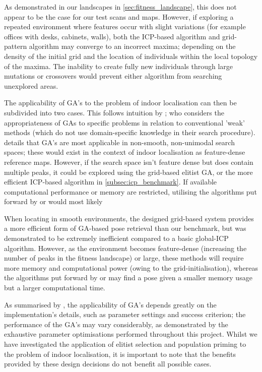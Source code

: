 \documentclass[authoryearcitations]{UoYCSproject}
\begin{document}
As demonstrated in our landscapes in \autoref{sec:fitness_landscape}, this does not appear to be the case for our test scans and maps. However, if exploring a repeated environment where features occur with slight variations (for example offices with desks, cabinets, walls), both the ICP-based algorithm and grid-pattern algorithm may converge to an incorrect maxima; depending on the density of the initial grid and the location of individuals within the local topology of the maxima. The inability to create fully new individuals through large mutations or crossovers would prevent either algorithm from searching unexplored areas.

The applicability of GA's to the problem of indoor localisation can then be subdivided into two cases. This follows intuition by \citet{Mitchell1998-td}; who considers the appropriateness of GAs to specific problems in relation to conventional 'weak' methods (which do not use domain-specific knowledge in their search procedure). \citeauthor{Mitchell1998-td} details that GA's are most applicable in non-smooth, non-unimodal search spaces; these would exist in the context of indoor localisation as feature-dense reference maps. However, if the search space isn't feature dense but does contain multiple peaks, it could be explored using the grid-based elitist GA, or the more efficient ICP-based algorithm in \autoref{subsec:icp_benchmark}. If available computational performance or memory are restricted, utilising the algorithms put forward by \citet{Robertson2002-ou} or \citet{Lenac2007-xm} would most likely 

When locating in smooth environments, the designed grid-based system provides a more efficient form of GA-based pose retrieval than our benchmark, but was demonstrated to be extremely inefficient compared to a basic global-ICP algorithm. However, as the environment becomes feature-dense (increasing the number of peaks in the fitness landscape) or large, these methods will require more memory and computational power (owing to the grid-initialisation), whereas the algorithms put forward by \citet{Robertson2002-ou} or \citet{Lenac2007-xm} may find a pose given a smaller memory usage but a larger computational time. 

As summarised by \citet{Mitchell1998-td}, the applicability of GA's depends greatly on the implementation's details, such as parameter settings and success criterion; the performance of the GA's may vary considerably, as demonstrated by the exhaustive parameter optimisations performed throughout this project. Whilst we have investigated the application of elitist selection and population priming to the problem of indoor localisation, it is important to note that the benefits provided by these design decisions do not benefit all possible cases.
\end{document}
